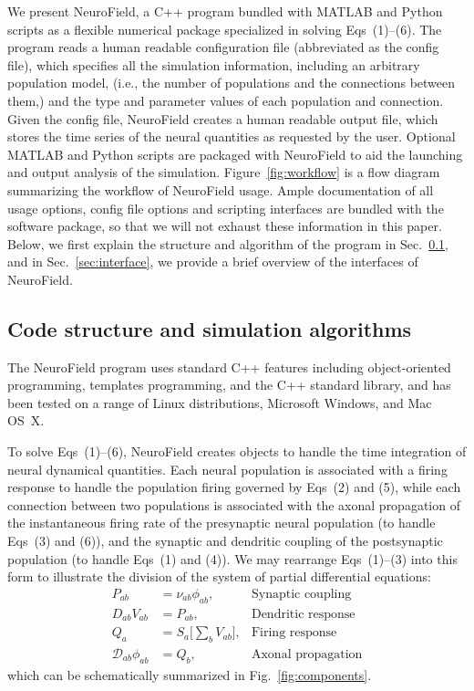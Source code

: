 \documentclass[preprint,review,10pt,authoryear,letterpaper]{elsarticle}
\begin{document}
We present NeuroField, a C++ program bundled with MATLAB and Python scripts as a flexible numerical package specialized in solving Eqs~(1)--(6). The program reads a human readable configuration file (abbreviated as the config file), which specifies all the simulation information, including an arbitrary population model, (i.e., the number of populations and the connections between them,) and the type and parameter values of each population and connection. Given the config file, NeuroField creates a human readable output file, which stores the time series of the neural quantities as requested by the user. Optional MATLAB and Python scripts are packaged with NeuroField to aid the launching and output analysis of the simulation. Figure~\ref{fig:workflow} is a flow diagram summarizing the workflow of NeuroField usage. Ample documentation of all usage options, config file options and scripting interfaces are bundled with the software package, so that we will not exhaust these information in this paper. Below, we first explain the structure and algorithm of the program in Sec.~\ref{sec:neurofield}, and in Sec.~\ref{sec:interface}, we provide a brief overview of the interfaces of NeuroField.

\subsection{Code structure and simulation algorithms}
\label{sec:neurofield}

The NeuroField program uses standard C++ features including object-ori\-ented programming, templates programming, and the C++ standard library, and has been tested on a range of Linux distributions, Microsoft Windows, and Mac OS~X.

To solve Eqs~(1)--(6), NeuroField creates objects to handle the time integration of neural dynamical quantities. Each neural population is associated with a firing response to handle the population firing governed by Eqs~(2) and (5), while each connection between two populations is associated with the axonal propagation of the instantaneous firing rate of the presynaptic neural population (to handle Eqs~(3) and (6)), and the synaptic and dendritic coupling of the postsynaptic population (to handle Eqs~(1) and (4)). We may rearrange Eqs~(1)--(3) into this form to illustrate the division of the system of partial differential equations:
\begin{align}
	P_{ab} &= \nu_{ab}\phi_{ab}, & \text{Synaptic coupling}\\
	D_{ab}V_{ab} &= P_{ab}, & \text{Dendritic response}\\
	Q_a &= S_a \big[\sum_b V_{ab} \big], & \text{Firing response}\\
	\mathcal{D}_{ab}\phi_{ab} &= Q_b,&  \text{Axonal propagation}
\end{align}
which can be schematically summarized in Fig.~\ref{fig:components}.
\end{document}
